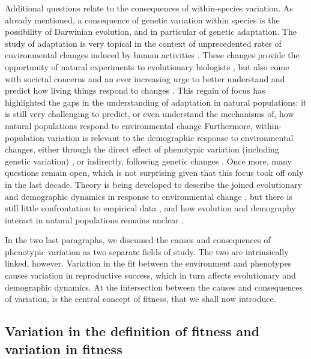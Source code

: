 Additional questions relate to the consequences of within-species variation. As already mentioned, a consequence of genetic variation within species is the possibility of Darwinian evolution, and in particular of genetic adaptation. The study of adaptation is very topical in the context of unprecedented rates of environmental changes induced by human activities \parencite{parmesan2006}. These changes provide the opportunity of natural experiments to evolutionary biologists \parencite{Altermatt2016, Brookfield2016}, but also come with societal concerns and an ever increasing urge to better understand and predict how living things respond to changes \parencite{McCarty2001, Shaw2013}. This regain of focus has highlighted the gaps in the understanding of adaptation in natural populations: it is still very challenging to predict, or even understand the mechanisms of, how natural populations respond to environmental change \parencite{Merila2001, Tafani2013, Shaw2013, Brookfield2016}
Furthermore, within-population variation is relevant to the demographic response to environmental changes, either through the direct effect of phenotypic variation (including genetic variation) \parencite{Kendall2011, vindenes2015, Plard2016}, or indirectly, following genetic changes \parencite{Chevin2010a, Turcotte2011, Schiffers2013a}. Once more, many questions remain open, which is not surprising given that this focus took off only in the last decade. Theory is being developed to describe the joined evolutionary and demographic dynamics in response to environmental change \parencite{Chevin2010a, Childs2016}, but there is still little confrontation to empirical data \parencite{Chevin2012, Gonzalez2013a}, and how evolution and demography interact in natural populations remains unclear \parencite{Charmantier2014climate, Gonzalez2013a}. 

In the two last paragraphs, we discussed the causes and consequences of phenotypic variation as two separate fields of study. The two are intrinsically linked, however. Variation in the fit between the environment and phenotypes causes variation in reproductive success, which in turn affects evolutionary and demographic dynamics. 
At the intersection between the causes and consequences of variation, is the central concept of fitness, that we  shall now introduce. 

\subsection{Variation in the definition of fitness and variation in fitness}

